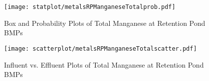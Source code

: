         \begin{figure}[hb]   %
            \centering
            \texttt{[image: statplot/metalsRPManganeseTotalprob.pdf]}
            \caption{Box and Probability Plots of Total Manganese at Retention Pond BMPs}
        \end{figure}         %
        
        
        \begin{figure}[hb]   %
            \centering
            \texttt{[image: scatterplot/metalsRPManganeseTotalscatter.pdf]}
            \caption{Influent vs. Effluent Plots of Total Manganese at Retention Pond BMPs}
        \end{figure}         %
        \clearpage
        